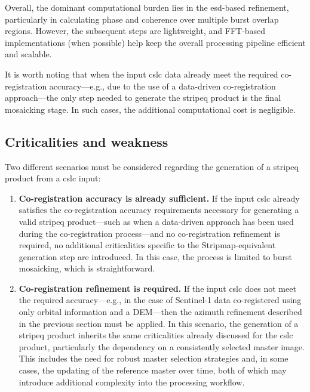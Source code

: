 Overall, the dominant computational burden lies in the \acs{esd}-based refinement, particularly in calculating phase and coherence over multiple burst overlap regions. However, the subsequent steps are lightweight, and FFT-based implementations (when possible) help keep the overall processing pipeline efficient and scalable. 

It is worth noting that when the input \acs{cslc} data already meet the required co-registration accuracy—e.g., due to the use of a data-driven co-registration approach—the only step needed to generate the \acs{stripeq} product is the final mosaicking stage. In such cases, the additional computational cost is negligible.

\subsection{Criticalities and weakness}
\label{sec:stripeq_criticalities}


Two different scenarios must be considered regarding the generation of a \acs{stripeq} product from a \acs{cslc} input:

\begin{enumerate}
\item \textbf{Co-registration accuracy is already sufficient.} If the input \acs{cslc} already satisfies the co-registration accuracy requirements necessary for generating a valid \acs{stripeq} product---such as when a data-driven approach has been used during the co-registration process---and no co-registration refinement is required, no additional criticalities specific to the Stripmap-equivalent generation step are introduced. In this case, the process is limited to burst mosaicking, which is straightforward.

\item \textbf{Co-registration refinement is required.} If the input \acs{cslc} does not meet the required accuracy---e.g., in the case of Sentinel-1 data co-registered using only orbital information and a DEM---then the azimuth refinement described in the previous section must be applied. In this scenario, the generation of a \acs{stripeq} product inherits the same criticalities already discussed for the \acs{cslc} product, particularly the dependency on a consistently selected master image. This includes the need for robust master selection strategies and, in some cases, the updating of the reference master over time, both of which may introduce additional complexity into the processing workflow.
\end{enumerate}